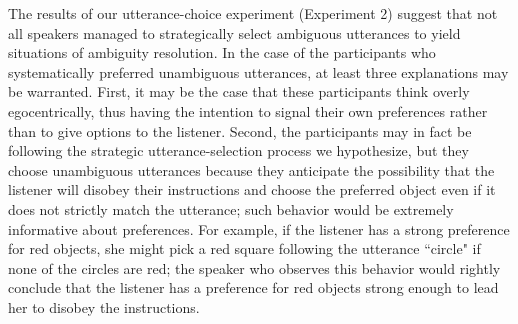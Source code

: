 \documentclass[11pt,a4paper]{article}
\newcommand{\gcs}[1]{\textcolor{blue}{[gcs: #1]}}
\begin{document}

The results of our utterance-choice experiment (Experiment 2) suggest that not all speakers managed to strategically select ambiguous utterances to yield situations of ambiguity resolution.
In the case of the participants who systematically preferred unambiguous utterances, at least three explanations may be warranted. 
First, it may be the case that these participants think overly egocentrically, thus having the intention to signal their own preferences rather than to give options to the listener.
Second, the participants may in fact be following the strategic utterance-selection process we hypothesize, but they choose unambiguous utterances because they anticipate the possibility that the listener will disobey their instructions and choose the preferred object even if it does not strictly match the utterance; such behavior would be extremely informative about preferences. 
For example, if the listener has a strong preference for red objects, she might pick a red square following the utterance ``circle" if none of the circles are red; the speaker who observes this behavior would rightly conclude that the listener has a preference for red objects strong enough to lead her to disobey the instructions.
\end{document}
